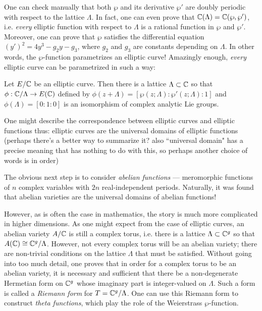 One can check manually that both $\wp$ and its derivative $\wp'$ are doubly periodic with respect to the lattice $\Lambda$. In fact, one can even prove that $\mathbb{C}(\Lambda)=\mathbb{C}(\wp,\wp')$, i.e. \emph{every} elliptic function with respect to $\Lambda$ is a rational function in $\wp$ and $\wp'$. Moreover, one can prove that $\wp$ satisfies the differential equation $(y')^2 = 4y^3-g_2y-g_3$, where $g_2$ and $g_3$ are constants depending on $\Lambda$. In other words, the $\wp$-function parametrizes an elliptic curve! Amazingly enough, \emph{every} elliptic curve can be parametrized in such a way:

\begin{theorem}
\label{uniformization}
Let $E/\mathbb{C}$ be an elliptic curve. Then there is a lattice $\Lambda\subset \mathbb{C}$ so that $\phi:\mathbb{C}/\Lambda\rightarrow E(\mathbb{C})$ defined by $\phi(z+\Lambda)=[\wp(z;\Lambda):\wp'(z;\Lambda):1]$ and $\phi(\Lambda) = [0:1:0]$ is an isomorphism of complex analytic Lie groups.
\end{theorem}

One might describe the correspondence between elliptic curves and elliptic functions thus: elliptic curves are the universal domains of elliptic functions (perhaps there's a better way to summarize it? also ``universal domain" has a precise meaning that has nothing to do with this, so perhaps another choice of words is in order)

The obvious next step is to consider \emph{abelian functions} --- meromorphic functions of $n$ complex variables with $2n$ real-independent periods. Naturally, it was found that abelian varieties are the universal domains of abelian functions!

However, as is often the case in mathematics, the story is much more complicated in higher dimensions. As one might expect from the case of elliptic curves, an abelian variety $A/\mathbb{C}$ is still a complex torus, i.e. there is a lattice $\Lambda\subset \mathbb{C}^g$ so that $A(\mathbb{C})\cong \mathbb{C}^g/\Lambda$. However, not every complex torus will be an abelian variety; there are non-trivial conditions on the lattice $\Lambda$ that must be satisfied. Without going into too much detail, one proves that in order for a complex torus to be an abelian variety, it is necessary and sufficient that there be a non-degenerate Hermetian form on $\mathbb{C}^g$ whose imaginary part is integer-valued on $\Lambda$. Such a form is called a \emph{Riemann form} for $T=\mathbb{C}^g/\Lambda$. One can use this Riemann form to construct \emph{theta functions}, which play the role of the Weierstrass $\wp$-function.

